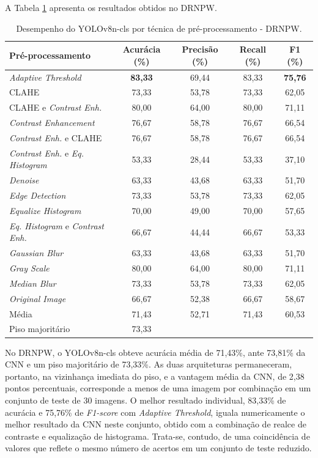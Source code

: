 A Tabela \ref{tab:drnpw_yolocls} apresenta os resultados obtidos no DRNPW.

\begin{table}[H]
    \centering
    \caption{\label{tab:drnpw_yolocls}Desempenho do YOLOv8n-cls por técnica de pré-processamento - DRNPW.}
    \vspace{0.2cm}
    \small
    \begin{tabular}{lcccc}
        \hline
        \textbf{Pré-processamento} & \textbf{Acurácia (\%)} & \textbf{Precisão (\%)} & \textbf{Recall (\%)} & \textbf{F1 (\%)} \\
        \hline
        \textit{Adaptive Threshold} & \textbf{83,33} & 69,44 & 83,33 & \textbf{75,76} \\
        CLAHE & 73,33 & 53,78 & 73,33 & 62,05 \\
        CLAHE e \textit{Contrast Enh.} & 80,00 & 64,00 & 80,00 & 71,11 \\
        \textit{Contrast Enhancement} & 76,67 & 58,78 & 76,67 & 66,54 \\
        \textit{Contrast Enh.} e CLAHE & 76,67 & 58,78 & 76,67 & 66,54 \\
        \textit{Contrast Enh.} e \textit{Eq. Histogram} & 53,33 & 28,44 & 53,33 & 37,10 \\
        \textit{Denoise} & 63,33 & 43,68 & 63,33 & 51,70 \\
        \textit{Edge Detection} & 73,33 & 53,78 & 73,33 & 62,05 \\
        \textit{Equalize Histogram} & 70,00 & 49,00 & 70,00 & 57,65 \\
        \textit{Eq. Histogram} e \textit{Contrast Enh.} & 66,67 & 44,44 & 66,67 & 53,33 \\
        \textit{Gaussian Blur} & 63,33 & 43,68 & 63,33 & 51,70 \\
        \textit{Gray Scale} & 80,00 & 64,00 & 80,00 & 71,11 \\
        \textit{Median Blur} & 73,33 & 53,78 & 73,33 & 62,05 \\
        \textit{Original Image} & 66,67 & 52,38 & 66,67 & 58,67 \\
        \hline
        Média & 71,43 & 52,71 & 71,43 & 60,53 \\
        Piso majoritário & 73,33 & & & \\
        \hline
    \end{tabular}
\end{table}

No DRNPW, o YOLOv8n-cls obteve acurácia média de 71,43\%, ante 73,81\% da CNN e um piso majoritário de 73,33\%. As duas arquiteturas permaneceram, portanto, na vizinhança imediata do piso, e a vantagem média da CNN, de 2,38 pontos percentuais, corresponde a menos de uma imagem por combinação em um conjunto de teste de 30 imagens. O melhor resultado individual, 83,33\% de acurácia e 75,76\% de \textit{F1-score} com \textit{Adaptive Threshold}, iguala numericamente o melhor resultado da CNN neste conjunto, obtido com a combinação de realce de contraste e equalização de histograma. Trata-se, contudo, de uma coincidência de valores que reflete o mesmo número de acertos em um conjunto de teste reduzido.

